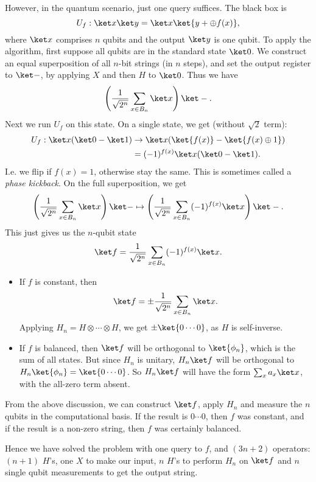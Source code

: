 \documentclass[12pt]{article}
\begin{document}
However, in the quantum scenario, just one query suffices. The black box is
\[
	U_f : \ket x \ket y = \ket x \ket{y + \oplus f(x)},
\]
where $\ket x$ comprises $n$ qubits and the output $\ket y$ is one qubit. To apply the algorithm, first suppose all qubits are in the standard state $\ket 0$. We construct an equal superposition of all $n$-bit strings (in $n$ steps), and set the output register to $\ket -$, by applying $X$ and then $H$ to $\ket 0$. Thus we have
\[
	\left( \frac{1}{\sqrt{2^n}} \sum_{x \in B_n} \ket x \right) \ket -.
\]
Next we run $U_f$ on this state. On a single state, we get (without $\sqrt 2$ term):
\begin{align*}
	U_f : \ket x(\ket 0 - \ket 1) &\to \ket x(\ket{f(x)} - \ket{f(x) \oplus 1}) \\
				      &= (-1)^{f(x)} \ket x (\ket 0 - \ket 1).
\end{align*}
I.e. we flip if $f(x) = 1$, otherwise stay the same. This is sometimes called a \emph{phase kickback}. On the full superposition, we get
\begin{align*}
	\left( \frac{1}{\sqrt{2^n}} \sum_{x \in B_n} \ket x \right) \ket - \mapsto \left( \frac{1}{\sqrt{2^n}} \sum_{x \in B_n}(-1)^{f(x)} \ket x \right) \ket -.
\end{align*}
This just gives us the $n$-qubit state
\[
	\ket f = \frac{1}{\sqrt{2^n}} \sum_{x \in B_n} (-1)^{f(x)} \ket x.
\]
\begin{itemize}
	\item If $f$ is constant, then
		\[
			\ket f = \pm \frac{1}{\sqrt{2^n}} \sum_{x \in B_n} \ket x.
		\]
		Applying $H_n = H \otimes \cdots \otimes H$, we get $\pm \ket{0\cdots 0}$, as $H$ is self-inverse.
	\item If $f$ is balanced, then $\ket f$ will be orthogonal to $\ket{\phi_n}$, which is the sum of all states. But since $H_n$ is unitary, $H_n \ket f$ will be orthogonal to $H_n \ket{\phi_n} = \ket{0 \cdots 0}$. So $H_n \ket f$ will have the form $\sum_x a_x \ket x$, with the all-zero term absent.
\end{itemize}
From the above discussion, we can construct $\ket f$, apply $H_n$ and measure the $n$ qubits in the computational basis. If the result is $0 \cdots 0$, then $f$ was constant, and if the result is a non-zero string, then $f$ was certainly balanced.

Hence we have solved the problem with one query to $f$, and $(3n + 2)$ operators: $(n +1)$ $H$'s, one $X$ to make our input, $n$ $H$'s to perform $H_n$ on $\ket f$ and $n$ single qubit measurements to get the output string.
\end{document}
